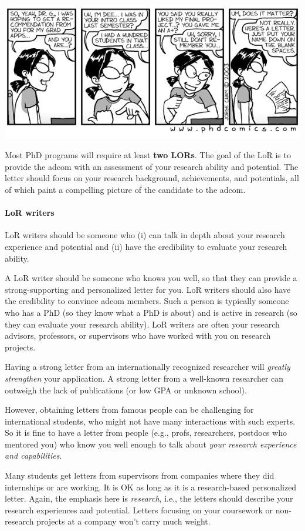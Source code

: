 \documentclass[oneside,11pt,dvipsnames]{book}
\begin{document}
\begin{center}
  \includegraphics[width=0.6\linewidth]{files/c6.png}
\end{center}


Most PhD programs will require at least \textbf{two LORs}. 
The goal of the LoR is to provide the adcom with an assessment of your research ability and potential. 
The letter should 
focus on your research background, achievements, and potentials, all of which paint a compelling picture of the candidate to the adcom.

\paragraph{LoR writers} LoR writers should be someone who (i) can talk in depth about your research experience and potential and (ii) have the credibility to evaluate your research ability.  

A LoR writer should be someone who knows you well, so that they can provide a strong-supporting and personalized letter for you.  
LoR writers should also have the credibility to convince adcom members. Such a person is typically someone who has a PhD (so they know what a PhD is about) and is active in research (so they can evaluate your research ability).
LoR writers are often your research advisors, professors, or supervisors who have worked with you on research projects.


Having a strong letter from an internationally recognized researcher will \emph{greatly strengthen} your application. A strong letter from a well-known researcher can outweigh the lack of publications (or low GPA or unknown school).


However, obtaining letters from famous people
can be challenging for international students, who might not have many interactions with such experts. So it is fine to have a letter from people (e.g., profs, researchers, postdocs who mentored you) who know you well enough to talk about \emph{your research experience and capabilities}. 

Many students get letters from supervisors from companies where they did internships or are working.  It is OK as long as it is a research-based personalized letter. Again, the emphasis here is \emph{research}, i.e., the letters should describe your research experiences and potential. Letters focusing on your coursework or non-research projects at a company won't carry much weight.
\end{document}
